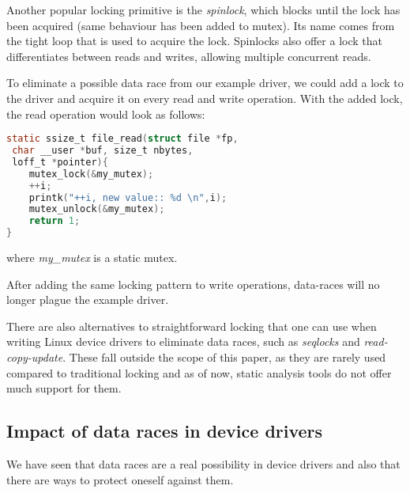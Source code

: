 \documentclass[..thesis.tex]{subfiles}
\begin{document}
Another popular locking primitive is the \textit{spinlock}, which blocks until the lock has been acquired (same behaviour has been added to mutex). Its name comes from the tight loop that is used to acquire the lock. Spinlocks also offer a lock that differentiates between reads and writes, allowing multiple concurrent reads.

To eliminate a possible data race from our example driver, we could add a lock to the driver and acquire it on every read and write operation. With the added lock, the read operation would look as follows:

\begin{lstlisting}[language=C,style=def]
static ssize_t file_read(struct file *fp,
 char __user *buf, size_t nbytes, 
 loff_t *pointer){
    mutex_lock(&my_mutex);
    ++i;
    printk("++i, new value:: %d \n",i);
    mutex_unlock(&my_mutex);
    return 1;
}
\end{lstlisting}

where \textit{my\_mutex} is a static mutex.

After adding the same locking pattern to write operations, data-races will no longer plague the example driver.




There are also alternatives to straightforward locking that one can use when writing Linux device drivers to eliminate data races, such as \textit{seqlocks} and \textit{read-copy-update}. These fall outside the scope of this paper, as they are rarely used compared to traditional locking and as of now, static analysis tools do not offer much support for them. 


\subsection{Impact of data races in device drivers}

We have seen that data races are a real possibility in device drivers and also that there are ways to protect oneself against them. 

\end{document}
